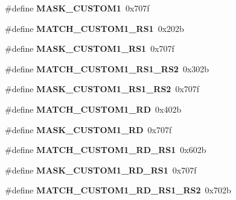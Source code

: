 \begin{DoxyCompactItemize}
\#define {\bfseries M\+A\+S\+K\+\_\+\+C\+U\+S\+T\+O\+M1}~0x707f
\item 
\mbox{\label{riscv-utility_8h_a4e87ba0f1ebdeb000d719494324ac610}} 
\#define {\bfseries M\+A\+T\+C\+H\+\_\+\+C\+U\+S\+T\+O\+M1\+\_\+\+R\+S1}~0x202b
\item 
\mbox{\label{riscv-utility_8h_aaf007a493bcc4d84984ee62c41881648}} 
\#define {\bfseries M\+A\+S\+K\+\_\+\+C\+U\+S\+T\+O\+M1\+\_\+\+R\+S1}~0x707f
\item 
\mbox{\label{riscv-utility_8h_a042071d05700ec29d1bb441ebb6e9196}} 
\#define {\bfseries M\+A\+T\+C\+H\+\_\+\+C\+U\+S\+T\+O\+M1\+\_\+\+R\+S1\+\_\+\+R\+S2}~0x302b
\item 
\mbox{\label{riscv-utility_8h_a431f672bc4fa4346949b592df4421f73}} 
\#define {\bfseries M\+A\+S\+K\+\_\+\+C\+U\+S\+T\+O\+M1\+\_\+\+R\+S1\+\_\+\+R\+S2}~0x707f
\item 
\mbox{\label{riscv-utility_8h_ae3b28b4829f15105f96bf73bf18ec2df}} 
\#define {\bfseries M\+A\+T\+C\+H\+\_\+\+C\+U\+S\+T\+O\+M1\+\_\+\+RD}~0x402b
\item 
\mbox{\label{riscv-utility_8h_a9d3849a226e7414ea6d7f441d0b1303f}} 
\#define {\bfseries M\+A\+S\+K\+\_\+\+C\+U\+S\+T\+O\+M1\+\_\+\+RD}~0x707f
\item 
\mbox{\label{riscv-utility_8h_a216e916d7e7a68bd3fb67c309168a4a8}} 
\#define {\bfseries M\+A\+T\+C\+H\+\_\+\+C\+U\+S\+T\+O\+M1\+\_\+\+R\+D\+\_\+\+R\+S1}~0x602b
\item 
\mbox{\label{riscv-utility_8h_a2a4139515171a38c356838eaee95bc52}} 
\#define {\bfseries M\+A\+S\+K\+\_\+\+C\+U\+S\+T\+O\+M1\+\_\+\+R\+D\+\_\+\+R\+S1}~0x707f
\item 
\mbox{\label{riscv-utility_8h_a1577b5c9146d7eeb5553767012fc134d}} 
\#define {\bfseries M\+A\+T\+C\+H\+\_\+\+C\+U\+S\+T\+O\+M1\+\_\+\+R\+D\+\_\+\+R\+S1\+\_\+\+R\+S2}~0x702b
\item 
\mbox{\label{riscv-utility_8h_a9eb311ef1e2c9a156b58f377635241da}} 

\end{DoxyCompactItemize}

